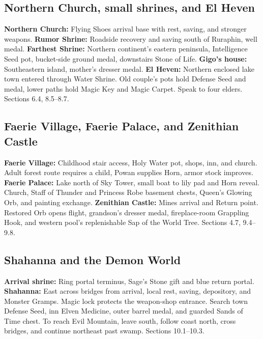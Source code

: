 \subsection{Northern Church, small shrines, and El Heven}
\textbf{Northern Church:} Flying Shoes arrival base with rest, saving, and stronger weapons. \textbf{Rumor Shrine:} Roadside recovery and saving south of Ruraphin, well medal. \textbf{Farthest Shrine:} Northern continent's eastern peninsula, Intelligence Seed pot, bucket-side ground medal, downstairs Stone of Life. \textbf{Gigo's house:} Southeastern island, mother's dresser medal. \textbf{El Heven:} Northern enclosed lake town entered through Water Shrine. Old couple's pots hold Defense Seed and medal, lower paths hold Magic Key and Magic Carpet. Speak to four elders. Sections 6.4, 8.5--8.7.

\subsection{Faerie Village, Faerie Palace, and Zenithian Castle}
\textbf{Faerie Village:} Childhood stair access, Holy Water pot, shops, inn, and church. Adult forest route requires a child, Powan supplies Horn, armor stock improves. \textbf{Faerie Palace:} Lake north of Sky Tower, small boat to lily pad and Horn reveal. Church, Staff of Thunder and Princess Robe basement chests, Queen's Glowing Orb, and painting exchange. \textbf{Zenithian Castle:} Mines arrival and Return point. Restored Orb opens flight, grandson's dresser medal, fireplace-room Grappling Hook, and western pool's replenishable Sap of the World Tree. Sections 4.7, 9.4--9.8.

\subsection{Shahanna and the Demon World}
\textbf{Arrival shrine:} Ring portal terminus, Sage's Stone gift and blue return portal. \textbf{Shahanna:} East across bridges from arrival, local rest, saving, depository, and Monster Gramps. Magic lock protects the weapon-shop entrance. Search town Defense Seed, inn Elven Medicine, outer barrel medal, and guarded Sands of Time chest. To reach Evil Mountain, leave south, follow coast north, cross bridges, and continue northeast past swamp. Sections 10.1--10.3.

